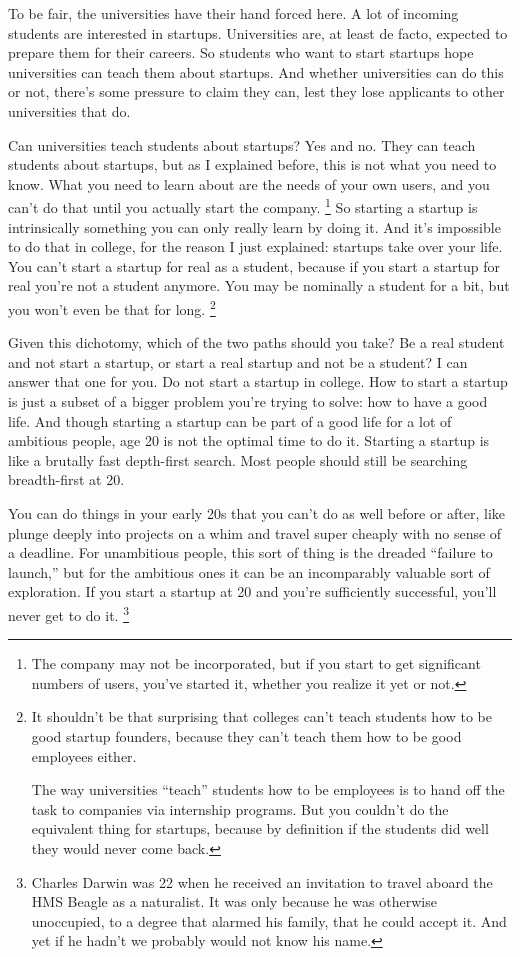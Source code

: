 \documentclass[12pt]{book}
\begin{document}
To be fair, the universities have their hand forced here. A lot of
incoming students are interested in startups. Universities are, at least
de facto, expected to prepare them for their careers. So students who
want to start startups hope universities can teach them about startups.
And whether universities can do this or not, there's some pressure to
claim they can, lest they lose applicants to other universities that do.

Can universities teach students about startups? Yes and no. They can
teach students about startups, but as I explained before, this is not
what you need to know. What you need to learn about are the needs of
your own users, and you can't do that until you actually start the
company. \footnote{The company may not be incorporated, but if you start to get
significant numbers of users, you've started it, whether you realize it
yet or not.} So starting a startup is intrinsically
something you can only really learn by doing it. And it's impossible to
do that in college, for the reason I just explained: startups take over
your life. You can't start a startup for real as a student, because if
you start a startup for real you're not a student anymore. You may be
nominally a student for a bit, but you won't even be that for long.
\footnote{It shouldn't be that surprising that colleges can't teach
students how to be good startup founders, because they can't teach them
how to be good employees either.

The way universities ``teach'' students how to be employees is to hand
off the task to companies via internship programs. But you couldn't do
the equivalent thing for startups, because by definition if the students
did well they would never come back.}

Given this dichotomy, which of the two paths should you take? Be a real
student and not start a startup, or start a real startup and not be a
student? I can answer that one for you. Do not start a startup in
college. How to start a startup is just a subset of a bigger problem
you're trying to solve: how to have a good life. And though starting a
startup can be part of a good life for a lot of ambitious people, age 20
is not the optimal time to do it. Starting a startup is like a brutally
fast depth-first search. Most people should still be searching
breadth-first at 20.

You can do things in your early 20s that you can't do as well before or
after, like plunge deeply into projects on a whim and travel super
cheaply with no sense of a deadline. For unambitious people, this sort
of thing is the dreaded ``failure to launch,'' but for the ambitious
ones it can be an incomparably valuable sort of exploration. If you
start a startup at 20 and you're sufficiently successful, you'll never
get to do it. \footnote{Charles Darwin was 22 when he received an invitation to travel
aboard the HMS Beagle as a naturalist. It was only because he was
otherwise unoccupied, to a degree that alarmed his family, that he could
accept it. And yet if he hadn't we probably would not know his name.}
\end{document}
